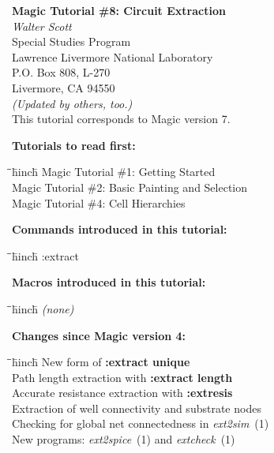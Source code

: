 \documentclass[letterpaper,twoside,12pt]{article}
\def\hinch{\hspace*{0.5in}}
\def\starti{\begin{center}\begin{tabbing}\hinch\=\hinch\=\hinch\=hinch\hinch\=\kill}
\def\endi{\end{tabbing}\end{center}}
\def\mytitle{Magic Tutorial \#8: Circuit Extraction}
\begin{document}
\makeatletter
\newcommand{\ps@magic}{%
	\renewcommand{\@oddhead}{\mytitle\hfil\today}%
	\renewcommand{\@evenhead}{\today\hfil\mytitle}%
	\renewcommand{\@evenfoot}{\hfil\textrm{--{\thepage}--}\hfil}%
	\renewcommand{\@oddfoot}{\@evenfoot}}
\newcommand{\ps@mplain}{%
	\renewcommand{\@oddhead}{}%
	\renewcommand{\@evenhead}{}%
	\renewcommand{\@evenfoot}{\hfil\textrm{--{\thepage}--}\hfil}%
	\renewcommand{\@oddfoot}{\@evenfoot}}
\makeatother
\pagestyle{magic}
\thispagestyle{mplain}


\begin{center}
  {\bfseries \Large \mytitle} \\
  \vspace*{0.5in}
  {\itshape Walter Scott} \\
  \vspace*{0.5in}
   Special Studies Program \\
   Lawrence Livermore National Laboratory \\
   P.O. Box 808, L-270 \\
   Livermore, CA  94550 \\
  \vspace*{0.25in}
  {\itshape (Updated by others, too.)} \\
  \vspace*{0.25in}
  This tutorial corresponds to Magic version 7. \\
\end{center}
\vspace*{0.5in}

{\noindent\bfseries\large Tutorials to read first:}
\starti
   \> Magic Tutorial \#1: Getting Started \\
   \> Magic Tutorial \#2: Basic Painting and Selection \\
   \> Magic Tutorial \#4: Cell Hierarchies
\endi

{\noindent\bfseries\large Commands introduced in this tutorial:}
\starti
   \> :extract
\endi

{\noindent\bfseries\large Macros introduced in this tutorial:}

\starti
   {\itshape (none)}
\endi

{\bfseries Changes since Magic version 4:}

\starti
   \> New form of {\bfseries :extract unique} \\
   \> Path length extraction with {\bfseries :extract length} \\
   \> Accurate resistance extraction with {\bfseries :extresis} \\
   \> Extraction of well connectivity and substrate nodes \\
   \> Checking for global net connectedness in {\itshape ext2sim}~(1) \\
   \> New programs: {\itshape ext2spice}~(1) and {\itshape extcheck}~(1) \\
\endi
\end{document}
